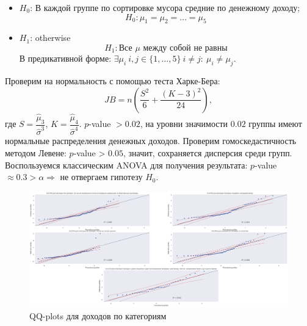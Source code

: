 \documentclass[12pt]{report}
\begin{document}
\begin{itemize}
  \item[] $H_0$: В каждой группе по сортировке мусора средние по денежному доходу;
  \[
      H_0: \mu_1 = \mu_2 = \ldots = \mu_5
  \]
  \item[] $H_1$: otherwise
  \[
      H_1: \text{Все } \mu \text{ между собой не равны}
  \]
  В предикативной форме: $\exists \mu_i\ i, j \in \{1, \ldots, 5\}\ i \neq j: \ \mu_i \neq \mu_j$.
\end{itemize}
Проверим на нормальность с помощью теста Харке-Бера:
\[
    JB = n \left(\dfrac{S^2}{6} + \dfrac{(K-3)^2}{24}\right),
\]
где $\displaystyle S = \dfrac{\hat{\mu}_3}{\hat{\sigma}^3}$, $\displaystyle K = \dfrac{\hat{\mu}_{4}}{\hat{\sigma}^4}$. $p$-value $> 0.02$, на уровни значимости $0.02$ группы имеют нормальные распределения денежных доходов. Проверим гомоскедастичность методом Левене: $p$-value > $0.05$, значит, сохраняется дисперсия среди групп. Воспользуемся классическим ANOVA для получения результата: $p$-value $\approx  0.3 > \alpha \Longrightarrow $ не отвергаем гипотезу $H_0$. 
\begin{figure}[H]
  \centering
  \includegraphics[scale=0.26]{title/qq_2.png}
  \caption{QQ-plots для доходов по категориям}
\end{figure} 
\end{document}
